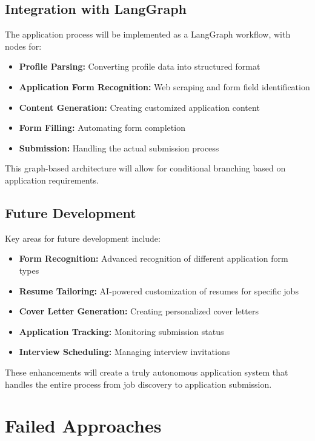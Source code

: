 \documentclass[a4paper,12pt]{article}
\begin{document}
\subsection{Integration with LangGraph}
The application process will be implemented as a LangGraph workflow, with nodes for:

\begin{itemize}
    \item \textbf{Profile Parsing:} Converting profile data into structured format
    \item \textbf{Application Form Recognition:} Web scraping and form field identification
    \item \textbf{Content Generation:} Creating customized application content
    \item \textbf{Form Filling:} Automating form completion
    \item \textbf{Submission:} Handling the actual submission process
\end{itemize}

This graph-based architecture will allow for conditional branching based on application requirements.

\subsection{Future Development}
Key areas for future development include:

\begin{itemize}
    \item \textbf{Form Recognition:} Advanced recognition of different application form types
    \item \textbf{Resume Tailoring:} AI-powered customization of resumes for specific jobs
    \item \textbf{Cover Letter Generation:} Creating personalized cover letters
    \item \textbf{Application Tracking:} Monitoring submission status
    \item \textbf{Interview Scheduling:} Managing interview invitations
\end{itemize}

These enhancements will create a truly autonomous application system that handles the entire process from job discovery to application submission.

\newpage

\section{Failed Approaches}
\end{document}
